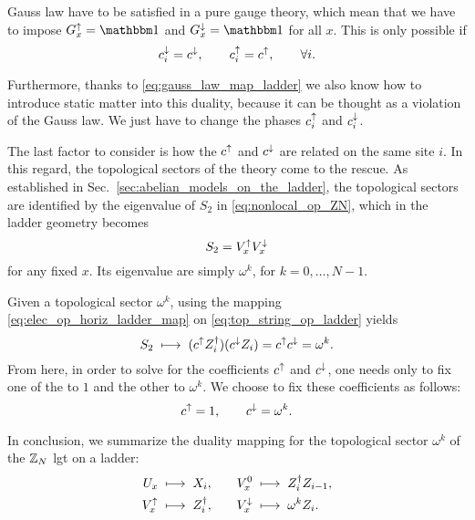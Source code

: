 Gauss law have to be satisfied in a pure gauge theory, which mean that we have to impose $G^\uparrow_x = \identity$ and $G^\downarrow_x = \identity$ for all $x$.
This is only possible if
\begin{equation}
    c^{\downarrow}_i = c^{\downarrow}, \qquad
    c^{\uparrow}_i = c^{\uparrow}, \qquad
    \forall i.
\end{equation}

Furthermore, thanks to \eqref{eq:gauss_law_map_ladder}  we also know how to introduce static matter into this duality, because it can be thought as a violation of the Gauss law.
We just have to change the phases $c^{\uparrow}_i$ and $c^{\downarrow}_i$.

The last factor to consider is how the $c^{\uparrow}$ and $c^{\downarrow}$ are related on the same site $i$.
In this regard, the topological sectors of the theory come to the rescue.
As established in Sec.~\ref{sec:abelian_models_on_the_ladder}, the topological sectors are identified by the eigenvalue of $S_2$ in \eqref{eq:nonlocal_op_ZN}, which in the ladder geometry becomes
\begin{equation}
    S_2 = V^{\uparrow}_x V^{\downarrow}_x
    \label{eq:top_string_op_ladder}
\end{equation}
for any fixed $x$.
Its eigenvalue are simply $\omega^k$, for $k = 0, \dots, N-1$.

Given a topological sector $\omega^k$, using the mapping \eqref{eq:elec_op_horiz_ladder_map} on \eqref{eq:top_string_op_ladder} yields
\begin{equation}
    S_2 \; \longmapsto \; ( c^{\uparrow} Z^\dagger_i ) ( c^{\downarrow} Z_i ) = c^{\uparrow} c^{\downarrow} = \omega^k.
\end{equation}
From here, in order to solve for the coefficients $c^{\uparrow}$ and $c^{\downarrow}$, one needs only to fix one of the to $1$ and the other to $\omega^k$.
We choose to fix these coefficients as follows:
\begin{equation}
    c^{\uparrow} = 1, \qquad
    c^{\downarrow} = \omega^k.
\end{equation}

In conclusion, we summarize the duality mapping for the topological sector $\omega^k$ of the $\mathbb{Z}_N$ \ac{lgt} on a ladder:
\begin{equation}
    \begin{aligned}
        U_x      & \; \longmapsto \; X_i, \quad &
        V^0_x    & \; \longmapsto \; Z^\dagger_i Z_{i-1}, \\
        V^{\uparrow}_x   & \; \longmapsto \; Z_i^\dagger, \quad &
        V^{\downarrow}_x & \; \longmapsto \; \omega^k Z_i.
    \end{aligned}
    \label{eq:ladder_duality}
\end{equation}

